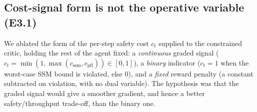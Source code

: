 %
%


\subsection{Cost-signal form is not the operative variable (E3.1)}
\label{sec:cost-form}

We ablated the form of the per-step safety cost $c_t$ supplied to the constrained
critic, holding the rest of the agent fixed: a \emph{continuous} graded signal
($c_t = \min(1,\max(c_\mathrm{ssm},c_\mathrm{pfl})) \in [0,1]$), a \emph{binary}
indicator ($c_t = 1$ when the worst-case SSM bound is violated, else $0$), and a
\emph{fixed} reward penalty (a constant subtracted on violation, with no dual
variable). The hypothesis was that the graded signal would give a smoother
gradient, and hence a better safety/throughput trade-off, than the binary one.

